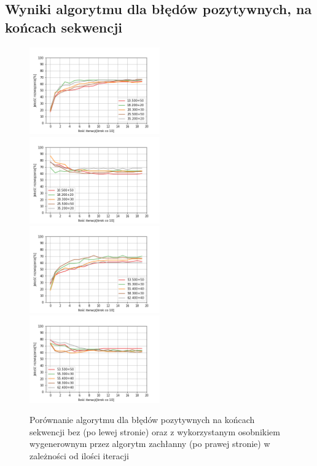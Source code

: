 \documentclass{article}
\begin{document}
\subsection{Wyniki algorytmu dla błędów pozytywnych, na końcach sekwencji}
\begin{figure}[H]
\includegraphics[width=0.5\textwidth]{poz-oli1.png}
\includegraphics[width=0.5\textwidth]{poz-oli-greedy1.png}
\includegraphics[width=0.5\textwidth]{poz-oli2.png}
\includegraphics[width=0.5\textwidth]{poz-oli-greedy2.png}
\caption{Porównanie algorytmu dla błędów pozytywnych na końcach sekwencji bez (po lewej stronie) oraz z wykorzystanym osobnikiem wygenerownym przez algorytm zachłanny (po prawej stronie) w zależności od ilości iteracji}
\end{figure}
\end{document}
